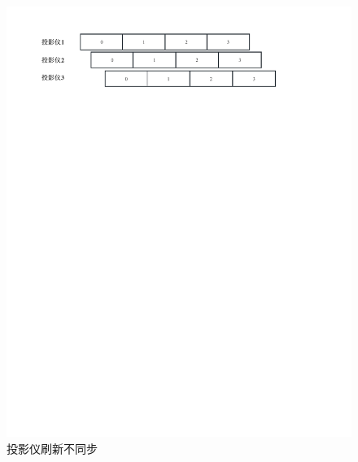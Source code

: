 \begin{figure}[h!]
    \begin{center}
        \includegraphics[width=\textwidth]{pictures/present.pdf}
        \caption{投影仪刷新不同步}
        \label{present}
    \end{center}
\end{figure}

